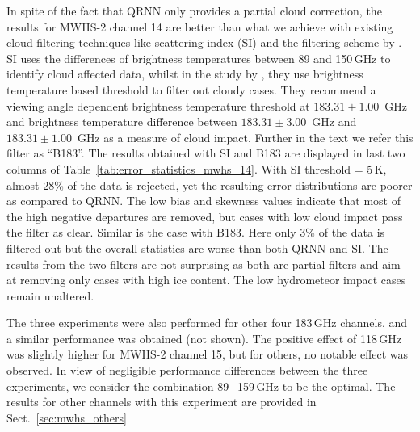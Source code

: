 \documentclass[amt, manuscript]{copernicus}
\begin{document}
In spite of the fact that QRNN only provides a partial cloud correction, the results for  MWHS-2 channel 14 are better than what we achieve with existing cloud filtering techniques like scattering index (SI) and the filtering scheme by \citet{buehler:aclou:07}. SI uses the differences of brightness temperatures between 89 and 150\,GHz to identify cloud affected data, whilst in the study by \citet{buehler:aclou:07}, they use brightness temperature based threshold to filter out cloudy cases. They recommend a viewing angle dependent brightness temperature threshold at $183.31\pm1.00$ \,GHz and brightness temperature difference between $183.31\pm3.00$ \,GHz and $183.31\pm 1.00$ \,GHz as a measure of cloud impact. Further in the text we refer this filter as ``B183''. The results obtained with SI and B183 are displayed in last two columns of Table~\ref{tab:error_statistics_mwhs_14}. With SI threshold = 5\,K, almost 28\% of the data is rejected, yet the resulting error distributions are poorer as compared to QRNN. The low bias and skewness values indicate that most of the high negative departures are removed, but cases with low cloud impact pass the filter as clear. Similar is the case with B183. Here only 3\% of the data is filtered out but the overall statistics are worse than both QRNN and SI. The results from the two filters are not surprising as both are partial filters and aim at removing only cases with high ice content. The low hydrometeor impact cases remain unaltered.

The three experiments were also performed for other four 183\,GHz channels, and a similar performance was obtained (not shown). The positive effect of 118\,GHz was slightly higher for MWHS-2 channel 15, but for others, no notable effect was observed. In view of negligible performance differences between the three experiments, we consider the combination 89+159\,GHz to be the optimal. The results for other channels with this experiment are provided in Sect.~\ref{sec:mwhs_others} 
\end{document}

